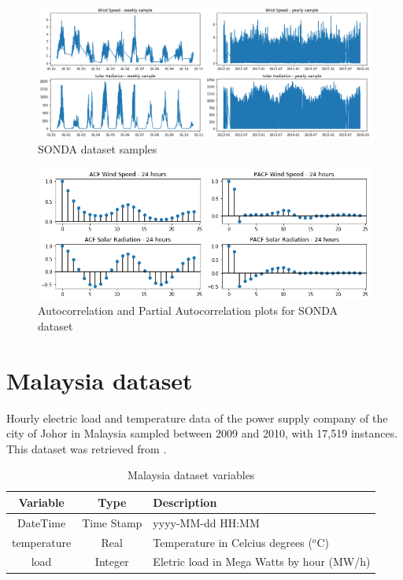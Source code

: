 \begin{figure}[htb]
    \centering
    \includegraphics[width=\textwidth]{figures/dataset_sonda.png}
    \caption{SONDA dataset samples}
    \label{fig:sonda}
\end{figure}

\begin{figure}[htb]
    \centering
    \includegraphics[width=\textwidth]{figures/dataset_sonda_acf.png}
    \caption{Autocorrelation and Partial Autocorrelation plots for SONDA dataset}
    \label{fig:sonda_acf}
\end{figure}

\section{Malaysia dataset}

Hourly electric load and temperature data of the power supply company of the city of Johor in Malaysia sampled between 2009 and 2010, with 17,519 instances. This dataset was retrieved from \cite{Sadaei2019}.

\begin{table}[htb]
    \centering
    \begin{tabular}{|c|c|l|} \hline
        \textbf{Variable} & \textbf{Type} & \textbf{Description}  \\ \hline
        DateTime & Time Stamp & yyyy-MM-dd HH:MM  \\ \hline
        temperature & Real & Temperature in Celcius degrees ($^o$C) \\ \hline
        load & Integer & Eletric load in Mega Watts by hour (MW/h)  \\ \hline
    \end{tabular}
    \caption{Malaysia dataset variables}
    \label{tab:malaysia_variables}
\end{table}

